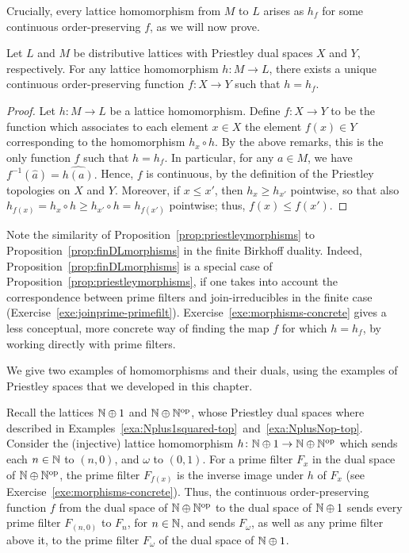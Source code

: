 Crucially, every lattice homomorphism from $M$ to $L$ arises as $h_f$ for some continuous order-preserving $f$, as we will now prove.



\begin{proposition}\label{prop:priestleymorphisms}
Let $L$ and $M$ be distributive lattices with Priestley dual spaces $X$ and $Y$, respectively. For any lattice homomorphism $h \colon M \to L$, there exists a unique continuous order-preserving function $f \colon X \to Y$ such that $h = h_f$.
\end{proposition}
\begin{proof}
Let $h \colon M \to L$ be a lattice homomorphism.
Define $f \colon X \to Y$ to be the function which associates to each element $x \in X$ the element $f(x) \in Y$ corresponding to the homomorphism $h_x \circ h$. By the above remarks, this is the only function $f$ such that $h = h_f$. In particular, for any $a \in M$, we have $f^{-1}(\widehat{a}) = \widehat{h(a)}.$
Hence, $f$ is continuous, by the definition of the Priestley topologies on $X$ and $Y$. Moreover, if $x \leq x'$, then $h_x \geq h_{x'}$ pointwise, so that also $h_{f(x)} = h_x \circ h \geq h_{x'} \circ h = h_{f(x')}$ pointwise; thus, $f(x) \leq f(x')$.
\end{proof}

Note the similarity of Proposition~\ref{prop:priestleymorphisms} to  Proposition~\ref{prop:finDLmorphisms} in the finite Birkhoff duality. Indeed, Proposition~\ref{prop:finDLmorphisms} is a special case of Proposition~\ref{prop:priestleymorphisms}, if one takes into account the correspondence between prime filters and join-irreducibles in the finite case (Exercise~\ref{exe:joinprime-primefilt}). Exercise~\ref{exe:morphisms-concrete} gives a less conceptual, more concrete way of finding the map $f$ for which $h = h_f$, by working directly with prime filters. 

We give two examples of homomorphisms and their duals, using the examples of Priestley spaces that we developed in this chapter.
\begin{example}
  Recall the lattices $\mathbb{N} \oplus 1$ and $\mathbb{N} \oplus \mathbb{N}^{\mathrm{op}}$, whose Priestley dual spaces where described in Examples~\ref{exa:Nplus1squared-top}~and~\ref{exa:NplusNop-top}.
  Consider the (injective) lattice homomorphism $h \colon \mathbb{N} \oplus 1 \to \mathbb{N} \oplus \mathbb{N}^{\mathrm{op}}$ which sends each $n \in \mathbb{N}$ to $(n,0)$, and $\omega$ to $(0,1)$. %
  For  a prime filter $F_x$ in the dual space of $\mathbb{N} \oplus \mathbb{N}^{\mathrm{op}}$, the prime filter $F_{f(x)}$ is the inverse image under $h$ of $F_x$ (see Exercise~\ref{exe:morphisms-concrete}). Thus, the continuous order-preserving function $f$ from the dual space of $\mathbb{N} \oplus \mathbb{N}^{\mathrm{op}}$ to the dual space of $\mathbb{N} \oplus 1$ sends every prime filter $F_{(n,0)}$ to $F_n$, for $n \in \mathbb{N}$, and sends $F_\omega$, as well as any prime filter above it, to the prime filter $F_\omega$ of the dual space of $\mathbb{N} \oplus 1$. 
\end{example}

